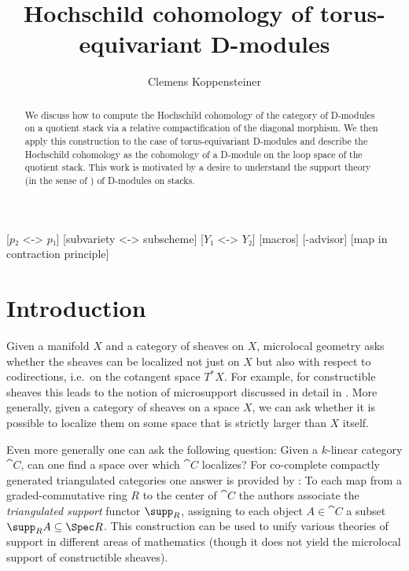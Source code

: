 \documentclass[english]{ck-article}
\title{Hochschild cohomology of torus-equivariant D-modules}
\author{Clemens Koppensteiner}
\begin{document}
\maketitle

[$p₂$ <-> $p₁$]
[subvariety <-> subscheme]
[$Y₁$ <-> $Y₂$]
[macros]
[-advisor]
[map in contraction principle]

\begin{abstract}
    We discuss how to compute the Hochschild cohomology of the category of D-modules on a quotient stack via a relative compactification of the diagonal morphism.
    We then apply this construction to the case of torus-equivariant D-modules and describe the Hochschild cohomology as the cohomology of a D-module on the loop space of the quotient stack.
    This work is motivated by a desire to understand the support theory (in the sense of \cite{BensonIyengarKrause:2008:LocalCohomologyAndSupportForTriangulatedCategories}) of D-modules on stacks.
\end{abstract}

\setcounter{tocdepth}{1}
\tableofcontents

\section{Introduction}

Given a manifold $X$ and a category of sheaves on $X$, microlocal geometry asks whether the sheaves can be localized not just on $X$ but also with respect to codirections, i.e.~on the cotangent space $T^*X$.
For example, for constructible sheaves this leads to the notion of microsupport discussed in detail in \cite{KashiwaraSchapira:1994:SheavesOnManifolds}.
More generally, given a category of sheaves on a space $X$, we can ask whether it is possible to localize them on some space that is strictly larger than $X$ itself.

Even more generally one can ask the following question: Given a $k$-linear category $\cat C$, can one find a space over which $\cat C$ localizes?
For co-complete compactly generated triangulated categories one answer is provided by \cite{BensonIyengarKrause:2008:LocalCohomologyAndSupportForTriangulatedCategories}:
To each map from a graded-commutative ring $R$ to the center of $\cat C$ the authors associate the \emph{triangulated support} functor $\supp_R$, assigning to each object $A ∈ \cat C$ a subset $\supp_R A \subseteq \Spec R$.
This construction can be used to unify various theories of support in different areas of mathematics (though it does not yield the microlocal support of constructible sheaves).
\end{document}
